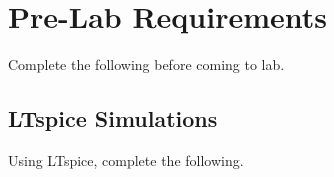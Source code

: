 \section{Pre-Lab Requirements}

Complete the following before coming to lab. 

\subsection{LTspice Simulations} \label{ssec:6spice}

Using LTspice, complete the following.

